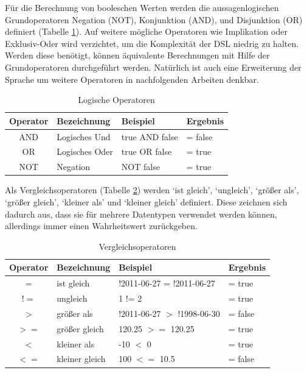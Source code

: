 Für die Berechnung von booleschen Werten werden die aussagenlogischen Grundoperatoren  Negation (NOT), Konjunktion (AND), und Disjunktion (OR) definiert (Tabelle \ref{tbl_logische_operatoren}). Auf weitere mögliche Operatoren wie Implikation oder Exklusiv-Oder wird verzichtet, um die Komplexität der DSL niedrig zu halten. Werden diese benötigt, können äquivalente Berechnungen mit Hilfe der Grundoperatoren durchgeführt werden. Natürlich ist auch eine Erweiterung der Sprache um weitere Operatoren in nachfolgenden Arbeiten denkbar.

\begin{table}
\begin{tabular}[h]{|c l l l|}
  	\hline
  	Operator & Bezeichnung & Beispiel &Ergebnis\\
  	\hline\hline
  	AND & Logisches Und & true AND false & = false\\
  	OR & Logisches Oder & true OR false & = true\\
  	NOT & Negation & NOT false & = true\\
  	\hline
\end{tabular}
\caption{Logische Operatoren}
\label{tbl_logische_operatoren}
\end{table}

Als Vergleichsoperatoren (Tabelle \ref{tbl_vergleichsoperatoren}) werden `ist gleich', `ungleich', `größer als', `größer gleich', `kleiner als' und `kleiner gleich' definiert. Diese zeichnen sich dadurch aus, dass sie für mehrere Datentypen verwendet werden können, allerdings immer einen Wahrheitswert zurückgeben. 

\begin{table}
\begin{tabular}[h]{|c l l l|}
  	\hline
  	Operator & Bezeichnung & Beispiel &Ergebnis\\
  	\hline\hline
  	$ =  $ & ist gleich      & !2011-06-27 = !2011-06-27 & = true \\
  	$ != $ & ungleich        & 1 != 2                    & = true \\
  	$ >  $ & größer als    & !2011-06-27 $ >  $ !1998-06-30 & = false \\
  	$ >= $ & größer gleich & 120.25 $ >=  $ 120.25           & = true \\
  	$ <  $ & kleiner als     & -10 $ < $ 0                   & = true \\
	$ <= $ & kleiner gleich  & 100 $ <= $ 10.5               & = false \\
  	\hline
\end{tabular}
\caption{Vergleichsoperatoren}
\label{tbl_vergleichsoperatoren}
\end{table}



